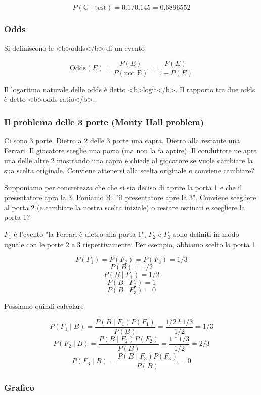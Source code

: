 \documentclass[onecolumn,12pt]{book}\usepackage[]{graphicx}\usepackage[]{color}
\begin{document}
$$P (\textrm{G}\mid\textrm{test}) = 0.1/0.145=
        0.6896552$$
        
       
        
        
\subsubsection{Odds}
        
Si definiscono le <b>odds</b> di un evento

$$\textrm{Odds}(E) = \frac{P(E)}{P(\textrm{not E})}= \frac{P(E)}{1 - P(E)}$$
        
Il logaritmo naturale delle odds è detto 
<b>logit</b>. Il rapporto tra due odds è detto <b>odds ratio</b>.

\subsubsection{Il  problema delle 3 porte (Monty Hall problem)}

Ci sono 3 porte. Dietro a 2 delle 3 porte una capra. Dietro alla restante una Ferrari.  Il giocatore sceglie una porta (ma non la fa aprire). Il conduttore ne apre una delle altre 2 mostrando una capra  e chiede al giocatore se vuole cambiare la sua scelta originale.
Conviene attenersi alla scelta originale o conviene cambiare? 

Supponiamo per concretezza che che si sia deciso di aprire la porta 1  e che il presentatore apra la 3. Poniamo B="il presentatore apre la 3". Conviene scegliere al porta 2 (e cambiare la nostra scelta iniziale) o restare ostinati e scegliere la porta 1?


$F_1$ è  l'evento "la Ferrari è dietro alla porta 1",  $F_2$ e $F_3$ sono definiti in modo uguale con le porte 2 e 3 rispettivamente.  Per esempio, abbiamo scelto la porta 1  







$$P(F_1)=P(F_2)=P(F_3) = 1/3$$
$$P(B) = 1/2$$
$$P(B \mid F_1) = 1/2$$
$$P(B \mid  F_2) = 1$$
$$P(B \mid  F_3) = 0$$

Possiamo quindi calcolare

$$P(F_1  \mid B) = \frac{P(B \mid F_1)P(F_1)}{P(B) }= \frac{1/2*1/3}{1/2} = 1/3$$
$$P(F_2  \mid B) = \frac{P(B  \mid F_2)P(F_2)}{P(B)} =\frac{1*1/3}{1/2} = 2/3$$
$$P(F_3  \mid B) = \frac{P(B \mid F_3)P(F_3)}{P(B)} = 0$$

\subsubsection{Grafico}
\end{document}
